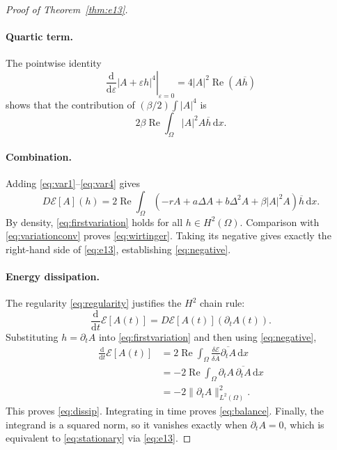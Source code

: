 \documentclass[11pt]{article}
\newcommand{\Om}{\Omega}
\newcommand{\E}{\mathcal E}
\newcommand{\dd}{\mathrm d}
\newcommand{\Real}{\operatorname{Re}}
\begin{document}
\begin{proof}[Proof of Theorem~\ref{thm:e13}]
\paragraph{Quartic term.}
The pointwise identity
\[
 \left.\frac{\dd}{\dd\varepsilon}|A+\varepsilon h|^4
 \right|_{\varepsilon=0}
   =4|A|^2\Real(A\overline h)
\]
shows that the contribution of $(\beta/2)\int|A|^4$ is
\begin{equation}\label{eq:var4}
 2\beta\Real\int_\Om|A|^2A\overline h\,\dd x.
\end{equation}

\paragraph{Combination.}
Adding \eqref{eq:var1}--\eqref{eq:var4} gives
\begin{equation}\label{eq:firstvariation}
 D\E[A](h)=2\Real\int_\Om
 (-rA+a\Delta A+b\Delta^2A+\beta|A|^2A)\overline h\,\dd x.
\end{equation}
By density, \eqref{eq:firstvariation} holds for all $h\in H^2(\Om)$.
Comparison with \eqref{eq:variationconv} proves \eqref{eq:wirtinger}.
Taking its negative gives exactly the right-hand side of
\eqref{eq:e13}, establishing \eqref{eq:negative}.

\paragraph{Energy dissipation.}
The regularity \eqref{eq:regularity} justifies the $H^2$ chain rule:
\[
 \frac{\dd}{\dd t}\E[A(t)]=D\E[A(t)](\partial_t A(t)).
\]
Substituting $h=\partial_t A$ into \eqref{eq:firstvariation} and then
using \eqref{eq:negative},
\begin{align*}
 \frac{\dd}{\dd t}\E[A(t)]
 &=2\Real\int_\Om
     \frac{\delta\E}{\delta\overline A}
        \overline{\partial_t A}\,\dd x\\
 &=-2\Real\int_\Om
       \partial_t A\,\overline{\partial_t A}\,\dd x\\
 &=-2\|\partial_t A\|_{L^2(\Om)}^2.
\end{align*}
This proves \eqref{eq:dissip}. Integrating in time proves
\eqref{eq:balance}. Finally, the integrand is a squared norm, so it
vanishes exactly when $\partial_t A=0$, which is equivalent to
\eqref{eq:stationary} via \eqref{eq:e13}.
\end{proof}
\end{document}
